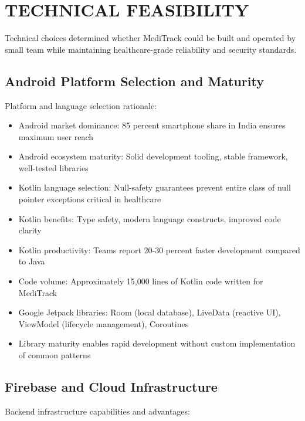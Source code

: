 \documentclass[12pt,a4paper]{report}
\begin{document}
\section{TECHNICAL FEASIBILITY}

Technical choices determined whether MediTrack could be built and operated by small team while maintaining healthcare-grade reliability and security standards.

\subsection{Android Platform Selection and Maturity}

Platform and language selection rationale:

\begin{itemize}
  \item Android market dominance: 85 percent smartphone share in India ensures maximum user reach
  \item Android ecosystem maturity: Solid development tooling, stable framework, well-tested libraries
  \item Kotlin language selection: Null-safety guarantees prevent entire class of null pointer exceptions critical in healthcare
  \item Kotlin benefits: Type safety, modern language constructs, improved code clarity
  \item Kotlin productivity: Teams report 20-30 percent faster development compared to Java
  \item Code volume: Approximately 15,000 lines of Kotlin code written for MediTrack
  \item Google Jetpack libraries: Room (local database), LiveData (reactive UI), ViewModel (lifecycle management), Coroutines
  \item Library maturity enables rapid development without custom implementation of common patterns
\end{itemize}

\subsection{Firebase and Cloud Infrastructure}

Backend infrastructure capabilities and advantages:
\end{document}
